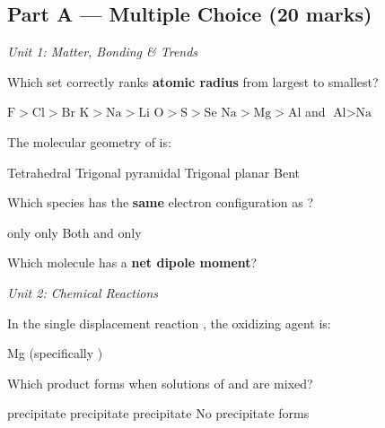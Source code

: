 \documentclass[addpoints]{exam}
\begin{document}
\newpage
\begin{questions}

\section*{Part A --- Multiple Choice (20 marks)}
\vspace{3mm}
\noindent\textit{Unit 1: Matter, Bonding \& Trends}
\vspace{3mm}

\question[1] Which set correctly ranks \textbf{atomic radius} from largest to smallest?
\begin{choices}
    \choice $\text{F} > \text{Cl} > \text{Br}$
    \correctchoice $\text{K} > \text{Na} > \text{Li}$
    \choice $\text{O} > \text{S} > \text{Se}$
    \choice $\text{Na} > \text{Mg} > \text{Al}$ and $\text{Al} > \text{Na}$
\end{choices}

\question[1] The molecular geometry of  is:
\begin{choices}
    \choice Tetrahedral
    \correctchoice Trigonal pyramidal
    \choice Trigonal planar
    \choice Bent
\end{choices}

\question[1] Which species has the \textbf{same} electron configuration as ?
\begin{choices}
    \choice {} only
    \choice {} only
    \correctchoice Both  and 
    \choice {} only
\end{choices}

\question[1] Which molecule has a \textbf{net dipole moment}?
\begin{choices}
    \choice {}
    \choice {}
    \correctchoice {}
    \choice {}
\end{choices}

\vspace{3mm}
\noindent\textit{Unit 2: Chemical Reactions}
\vspace{3mm}

\question[1] In the single displacement reaction ,
the oxidizing agent is:
\begin{choices}
    \choice Mg
    \correctchoice {} (specifically )
    \choice {}
    \choice {}
\end{choices}

\question[1] Which product forms when solutions of  and  are mixed?
\begin{choices}
    \choice {} precipitate
    \correctchoice {} precipitate
    \choice {} precipitate
    \choice No precipitate forms
\end{choices}


\end{questions}
\end{document}
